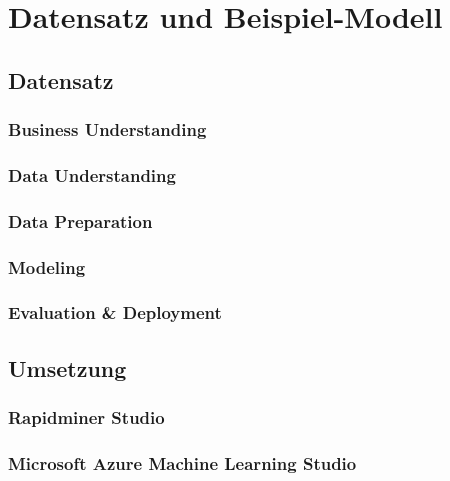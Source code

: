 %


%
%
\chapter{Datensatz und Beispiel-Modell}
\label{sec:example}

\section{Datensatz}
\label{sec:example:data}

\subsection{Business Understanding}
\label{sec:example:data:bu}

\subsection{Data Understanding}
\label{sec:example:data:du}

\subsection{Data Preparation}
\label{sec:example:data:dp}

\subsection{Modeling}
\label{sec:example:data:mod}

\subsection{Evaluation & Deployment}
\label{sec:example:data:eval}

\section{Umsetzung}
\label{sec:example:impl}

\subsection{Rapidminer Studio}
\label{sec:example:impl:rm}

\subsection{Microsoft Azure Machine Learning Studio}
\label{sec:example:impl:msa}
